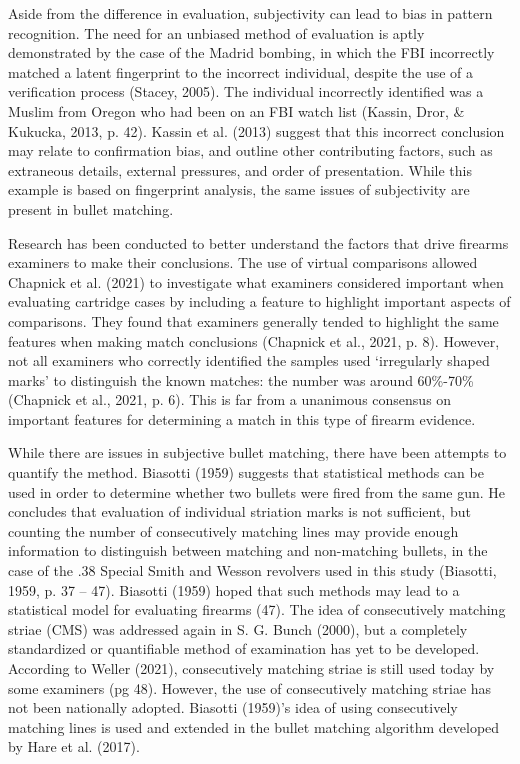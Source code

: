 \documentclass[print]{nuthesis}
\begin{document}
Aside from the difference in evaluation, subjectivity can lead to bias in pattern recognition.
The need for an unbiased method of evaluation is aptly demonstrated by the case of the Madrid bombing, in which the FBI incorrectly matched a latent fingerprint to the incorrect individual, despite the use of a verification process (Stacey, 2005).
The individual incorrectly identified was a Muslim from Oregon who had been on an FBI watch list (Kassin, Dror, \& Kukucka, 2013, p. 42).
Kassin et al. (2013) suggest that this incorrect conclusion may relate to confirmation bias, and outline other contributing factors, such as extraneous details, external pressures, and order of presentation.
While this example is based on fingerprint analysis, the same issues of subjectivity are present in bullet matching.

Research has been conducted to better understand the factors that drive firearms examiners to make their conclusions.
The use of virtual comparisons allowed Chapnick et al. (2021) to investigate what examiners considered important when evaluating cartridge cases by including a feature to highlight important aspects of comparisons.
They found that examiners generally tended to highlight the same features when making match conclusions (Chapnick et al., 2021, p. 8).
However, not all examiners who correctly identified the samples used `irregularly shaped marks' to distinguish the known matches: the number was around 60\%-70\% (Chapnick et al., 2021, p. 6).
This is far from a unanimous consensus on important features for determining a match in this type of firearm evidence.

While there are issues in subjective bullet matching, there have been attempts to quantify the method.
Biasotti (1959) suggests that statistical methods can be used in order to determine whether two bullets were fired from the same gun.
He concludes that evaluation of individual striation marks  is not sufficient, but counting the number of consecutively matching lines may provide enough information to distinguish between matching and non-matching bullets, in the case of the .38 Special Smith and Wesson revolvers used in this study (Biasotti, 1959, p. 37 -- 47).
Biasotti (1959) hoped that such methods may lead to a statistical model for evaluating firearms (47).
The idea of consecutively matching striae (CMS) was addressed again in S. G. Bunch (2000), but a completely standardized or quantifiable method of examination has yet to be developed.
According to Weller (2021), consecutively matching striae is still used today by some examiners (pg 48). However, the use of consecutively matching striae has not been nationally adopted.
Biasotti (1959)'s idea of using consecutively matching lines is used and extended in the bullet matching algorithm developed by Hare et al. (2017).
\end{document}
